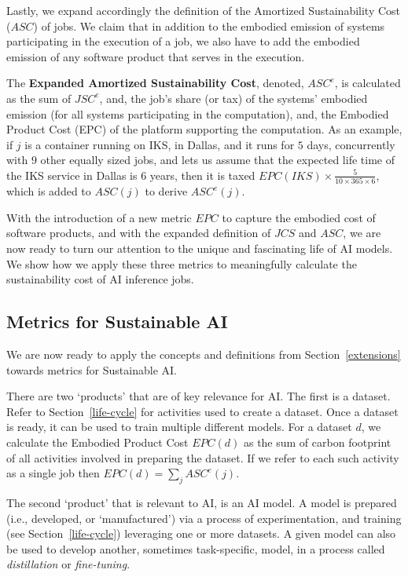 {{        Lastly, we expand accordingly the definition of the Amortized Sustainability Cost ($ASC$) of jobs. We claim that in addition to the embodied emission of systems participating in the execution of a job, we also have to add the embodied emission of any software product that serves in the execution.

        The \textbf{Expanded Amortized Sustainability Cost}, denoted, $ASC^{e}$, is calculated as the sum of $JSC^{e}$, and, the job’s share (or tax) of the systems' embodied emission (for all systems participating in the computation), and, the Embodied Product Cost (EPC) of the platform supporting the computation. As an example, if $j$ is a container running on IKS, in Dallas, and it runs for $5$ days, concurrently with $9$ other equally sized jobs, and lets us assume that the expected life time of the IKS service in Dallas is $6$ years, then it is taxed $EPC \! \left ( IKS \right ) \times \frac{5}{10 \times 365 \times 6}$, which is added to $ASC \! \left ( j \right )$ to derive $ASC^{e} \! \left ( j \right )$. 

        With the introduction of a new metric $EPC$ to capture the embodied cost of software products, and with the expanded definition of $JCS$ and $ASC$, we are now ready to turn our attention to the unique and fascinating life of AI models. We show how we apply these three metrics to meaningfully calculate the sustainability cost of AI inference jobs. 
    }

    \subsection{Metrics for Sustainable AI} 
    {
        \label{application}

        We are now ready to apply the concepts and definitions from Section~\ref{extensions} towards metrics for Sustainable AI. 

        There are two `products' that are of key relevance for AI. The first is a dataset. Refer to Section~\ref{life-cycle} for activities used to create a dataset. Once a dataset is ready, it can be used to train multiple different models. For a dataset $d$, we calculate the Embodied Product Cost $EPC \! \left ( d \right )$ as the sum of carbon footprint of all activities involved in preparing the dataset. If we refer to each such activity as a single job then $EPC \! \left ( d \right ) = \sum_{j} ASC^{e} \! \left ( j \right )$. 

        The second `product' that is relevant to AI, is an AI model. A model is prepared (i.e., developed, or `manufactured') via a process of experimentation, and training (see Section~\ref{life-cycle}) leveraging one or more datasets. A given model can also be used to develop another, sometimes task-specific, model, in a process called \textit{distillation} or \textit{fine-tuning}. 

}}
